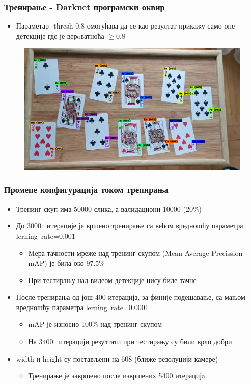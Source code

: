 \begin{frame}
\frametitle{Тренирање - Darknet програмски оквир}
\begin{itemize}
 \item Параметар \alert{-thresh 0.8}  омогућава да се као
резултат прикажу само оне детекције где је верoватноћа $\geq 0.8$
\end{itemize}
\begin{figure}[H]
  \centering
      \includegraphics[scale=0.2]{slike/TestVideo.png}
\end{figure}
\end{frame}

\begin{frame}
\frametitle{Промене конфигурација током тренирања}
\begin{itemize}
 \item Тренинг скуп има 50000 слика, а валидациони 10000 (20\%)
 \item \alert{До 3000.\ }итерације је вршено тренирање
 са \alert{већом} вредношћу параметра \mbox{\alert{lerning\ rate=0.001}}
 \begin{itemize}
  \item Mера тачности мреже над тренинг скупом
  (Mean Average Precission - mAP) је била око 97.5\%
  \item При тестирању над видеом \alert{детекције нису биле тачне}
 \end{itemize}
 
 \item После тренирања од \alert{још 400 итерација}, за \alert{финије подешавање},
  са \alert{мањом} вредношћу параметра
  \mbox{\alert{lerning\ rate=0.0001}}
 \begin{itemize}
  \item mAP је износио 100\% над тренинг скупом
  \item На 3400.\ итерацији \alert{резултати} при
  тестирању су били \alert{врло добри}
 \end{itemize}
 
 \item \alert{width} и \alert{height} су постављени на \alert{608}
 (ближе резолуцији камере)
 \begin{itemize}
  \item Тренирање је завршено после извршених \alert{5400} итерацијa
 \end{itemize}
\end{itemize}
\end{frame}

